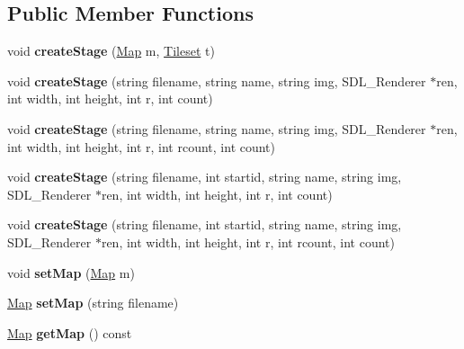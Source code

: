 \subsection*{Public Member Functions}
\begin{DoxyCompactItemize}
\item 
void {\bfseries create\+Stage} (\hyperlink{classMap}{Map} m, \hyperlink{classTileset}{Tileset} t)\hypertarget{classStage_a716561c7b2b148b67e7cf4952bae937b}{}\label{classStage_a716561c7b2b148b67e7cf4952bae937b}

\item 
void {\bfseries create\+Stage} (string filename, string name, string img, S\+D\+L\+\_\+\+Renderer $\ast$ren, int width, int height, int r, int count)\hypertarget{classStage_ad552bc548e34ff668944a6fc20b2aa0d}{}\label{classStage_ad552bc548e34ff668944a6fc20b2aa0d}

\item 
void {\bfseries create\+Stage} (string filename, string name, string img, S\+D\+L\+\_\+\+Renderer $\ast$ren, int width, int height, int r, int rcount, int count)\hypertarget{classStage_a871e4913cf2566a1a3a21c9d2e962648}{}\label{classStage_a871e4913cf2566a1a3a21c9d2e962648}

\item 
void {\bfseries create\+Stage} (string filename, int startid, string name, string img, S\+D\+L\+\_\+\+Renderer $\ast$ren, int width, int height, int r, int count)\hypertarget{classStage_a8ab003560188a4004ee497fd23692833}{}\label{classStage_a8ab003560188a4004ee497fd23692833}

\item 
void {\bfseries create\+Stage} (string filename, int startid, string name, string img, S\+D\+L\+\_\+\+Renderer $\ast$ren, int width, int height, int r, int rcount, int count)\hypertarget{classStage_a2d9071d75c90883539cd303c128a6b7d}{}\label{classStage_a2d9071d75c90883539cd303c128a6b7d}

\item 
void {\bfseries set\+Map} (\hyperlink{classMap}{Map} m)\hypertarget{classStage_a47a215785ca66ffae354c350aee1800e}{}\label{classStage_a47a215785ca66ffae354c350aee1800e}

\item 
\hyperlink{classMap}{Map} {\bfseries set\+Map} (string filename)\hypertarget{classStage_a11b7cabe85812fda7513d14d6b21ff6a}{}\label{classStage_a11b7cabe85812fda7513d14d6b21ff6a}

\item 
\hyperlink{classMap}{Map} {\bfseries get\+Map} () const \hypertarget{classStage_a5f18e19add54b6919e9d316e4c0cdaf1}{}\label{classStage_a5f18e19add54b6919e9d316e4c0cdaf1}


\end{DoxyCompactItemize}
